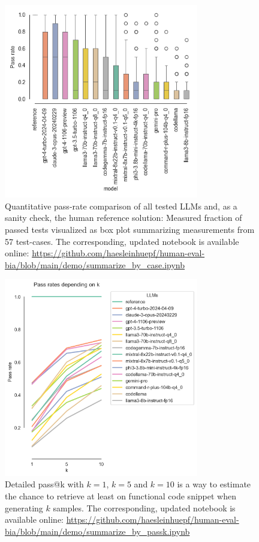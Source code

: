 \documentclass{ecai}
\begin{document}
\begin{figure}[h]
\centering
\includegraphics[width=8.5cm]{pass_rate_llms.png}
\caption{Quantitative pass-rate comparison of all tested LLMs and, as a sanity check, the human reference solution: Measured fraction of passed tests visualized as box plot summarizing measurements from 57 test-cases. The corresponding, updated notebook is available online: 
\url{https://github.com/haesleinhuepf/human-eval-bia/blob/main/demo/summarize_by_case.ipynb}
\newline
\newline
}
\label{fig:passratellms}
\end{figure}

\begin{figure}[h]
\centering
\includegraphics[width=8.5cm]{pass_k_llms_plot.png}
\caption{Detailed pass@k with $k=1$, $k=5$ and $k=10$ is a way to estimate the chance to retrieve at least on functional code snippet when generating $k$ samples. The corresponding, updated notebook is available online: 
\url{https://github.com/haesleinhuepf/human-eval-bia/blob/main/demo/summarize_by_passk.ipynb}
\newline
\newline
}
\label{fig:passk}
\end{figure}
\end{document}
